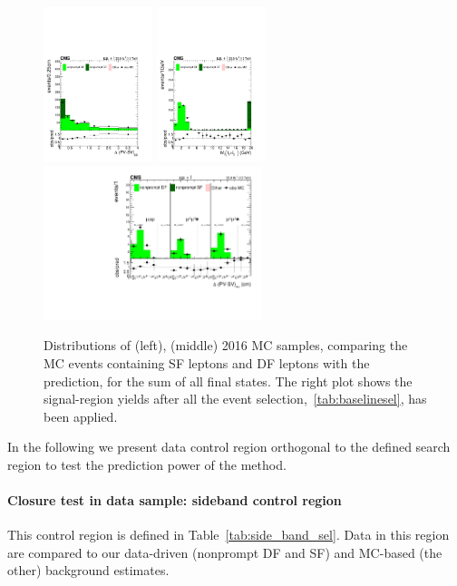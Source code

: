 \begin{figure}[h!]
  \centering
  \includegraphics[clip,trim=0.cm 0.cm 0.5cm 0.5cm,height=4.5cm]{Figures/c6/backgrounds/mc_closure/mu_DeltaPV_SV_2D_zomm__0.pdf}
  \includegraphics[clip,trim=0.cm 0.cm 0.5cm 0.5cm,height=4.5cm]{Figures/c6/backgrounds/mc_closure/mu_M_ll_l2_l3_zoom__0.pdf}
  \includegraphics[clip,trim=0.5cm 0.cm 0.5cm 0.5cm,height=4.5cm]{Figures/c6/backgrounds/mc_closure/mu_SR__final.pdf}
  \caption{Distributions of \Deltwod (left), \mtwol (middle)
    2016 \ttbar MC samples,
    comparing the MC events containing SF leptons
    and DF leptons with the
    prediction, for the sum of all final states.
    The right plot shows the signal-region yields after all the event
    selection,~\ref{tab:baselinesel}, has been applied.}
  \label{fig:mcClosure}
\end{figure}

In the following we present data control region orthogonal to the defined search region to test the
prediction power of the method. 


 \paragraph{Closure test in data sample: sideband control region}\label{sec:llsidebandcr}
This control region is defined in Table~\ref{tab:side_band_sel}.
Data in this region are compared to our data-driven (nonprompt DF and
SF) and MC-based (the other) background estimates.

